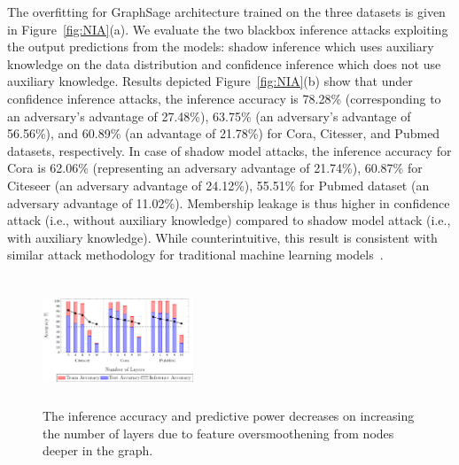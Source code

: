 The overfitting for GraphSage architecture trained on the three datasets is given in Figure~\ref{fig:NIA}(a).
We evaluate the two blackbox inference attacks exploiting the output predictions from the models: shadow inference which uses auxiliary knowledge on the data distribution and confidence inference which does not use auxiliary knowledge.
Results depicted Figure~\ref{fig:NIA}(b) show that under confidence inference attacks, the inference accuracy is 78.28\% (corresponding to an adversary's advantage of 27.48\%), 63.75\% (an adversary's advantage of 56.56\%), and 60.89\% (an advantage of 21.78\%) for Cora, Citesser, and Pubmed datasets, respectively.
In case of shadow model attacks, the inference accuracy for Cora is 62.06\% (representing an adversary advantage of 21.74\%), 60.87\% for Citeseer (an adversary advantage of 24.12\%), 55.51\% for Pubmed dataset (an adversary advantage of 11.02\%).
Membership leakage is thus higher in confidence attack (i.e., without auxiliary knowledge) compared to shadow model attack (i.e., with auxiliary knowledge). While counterintuitive, this result is consistent with similar attack methodology for traditional machine learning models~\cite{princeton}.


\begin{figure}[t]
\centering
\includegraphics[width=0.4\textwidth,height=3.8cm]{./figures/BBMIA/gsage_numlayers.pdf}
\caption{The inference accuracy and predictive power decreases on increasing the number of layers due to feature oversmoothening from nodes deeper in the graph.}
\label{fig:numlayers}
\end{figure}


